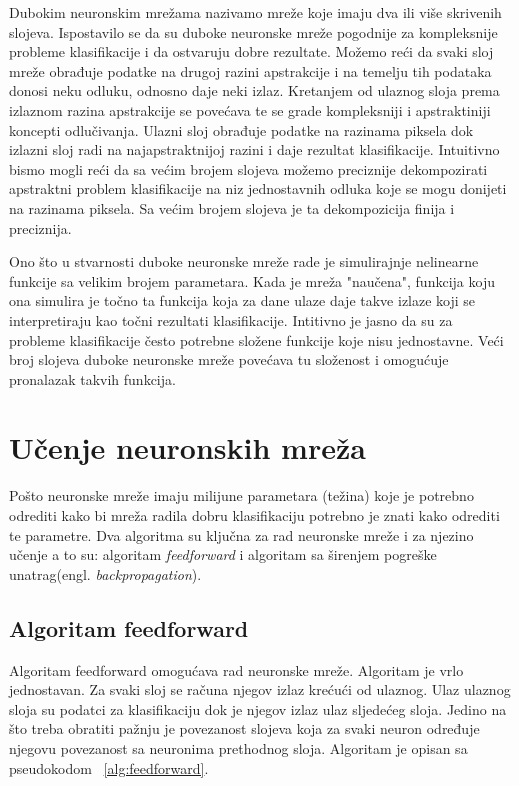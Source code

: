 \documentclass[times, utf8, zavrsni, numeric]{fer}
\begin{document}
Dubokim neuronskim mrežama nazivamo mreže koje imaju dva ili više skrivenih slojeva. Ispostavilo se da su duboke neuronske mreže pogodnije za kompleksnije probleme klasifikacije i da ostvaruju dobre rezultate. Možemo reći da svaki sloj mreže obrađuje podatke na drugoj razini apstrakcije i na temelju tih podataka donosi neku odluku, odnosno daje neki izlaz. Kretanjem od ulaznog sloja prema izlaznom razina apstrakcije se povećava te se grade kompleksniji i apstraktiniji koncepti odlučivanja. Ulazni sloj obrađuje podatke na razinama piksela dok izlazni sloj radi na najapstraktnijoj razini i daje rezultat klasifikacije. Intuitivno bismo mogli reći da sa većim brojem slojeva možemo preciznije dekompozirati apstraktni problem klasifikacije na niz jednostavnih odluka koje se mogu donijeti na razinama piksela. Sa većim brojem slojeva je ta dekompozicija finija i preciznija.

Ono što u stvarnosti duboke neuronske mreže rade je simulirajnje nelinearne funkcije sa velikim brojem parametara. Kada je mreža "naučena", funkcija koju ona simulira je točno ta funkcija koja za dane ulaze daje takve izlaze koji se interpretiraju kao točni rezultati klasifikacije. Intitivno je jasno da su za probleme klasifikacije često potrebne složene funkcije koje nisu jednostavne. Veći broj slojeva duboke neuronske mreže povećava tu složenost i omogućuje pronalazak takvih funkcija.

\section{Učenje neuronskih mreža}
Pošto neuronske mreže imaju milijune parametara (težina) koje je potrebno odrediti kako bi mreža radila dobru klasifikaciju potrebno je znati kako odrediti te parametre. Dva algoritma su ključna za rad neuronske mreže i za njezino učenje a to su: algoritam \textit{feedforward} i algoritam sa širenjem pogreške unatrag(engl. \textit{backpropagation}).

\subsection{Algoritam feedforward}
Algoritam feedforward omogućava rad neuronske mreže. Algoritam je vrlo jednostavan. Za svaki sloj se  računa njegov izlaz krećući od ulaznog. Ulaz ulaznog sloja su podatci za klasifikaciju dok je njegov izlaz ulaz sljedećeg sloja. Jedino na što treba obratiti pažnju je povezanost slojeva koja za svaki neuron određuje njegovu povezanost sa neuronima prethodnog sloja. Algoritam je opisan sa pseudokodom ~\ref{alg:feedforward}.
\end{document}
